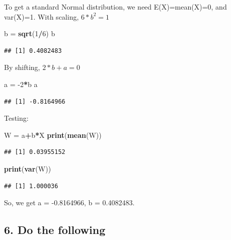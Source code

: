 \documentclass[
]{article}
\newenvironment{Shaded}{\begin{snugshade}}{\end{snugshade}}
\newcommand{\DecValTok}[1]{\textcolor[rgb]{0.00,0.00,0.81}{#1}}
\newcommand{\KeywordTok}[1]{\textcolor[rgb]{0.13,0.29,0.53}{\textbf{#1}}}
\newcommand{\NormalTok}[1]{#1}
\newcommand{\OperatorTok}[1]{\textcolor[rgb]{0.81,0.36,0.00}{\textbf{#1}}}
\newcommand{\StringTok}[1]{\textcolor[rgb]{0.31,0.60,0.02}{#1}}
\begin{document}
To get a standard Normal distribution, we need E(X)=mean(X)=0, and
var(X)=1. With scaling, \(6*b^2=1\)

\begin{Shaded}
\begin{Highlighting}[]
\NormalTok{b =}\StringTok{ }\KeywordTok{sqrt}\NormalTok{(}\DecValTok{1}\OperatorTok{/}\DecValTok{6}\NormalTok{)}
\NormalTok{b}
\end{Highlighting}
\end{Shaded}

\begin{verbatim}
## [1] 0.4082483
\end{verbatim}

By shifting, \(2*b+a=0\)

\begin{Shaded}
\begin{Highlighting}[]
\NormalTok{a =}\StringTok{ }\DecValTok{-2}\OperatorTok{*}\NormalTok{b}
\NormalTok{a}
\end{Highlighting}
\end{Shaded}

\begin{verbatim}
## [1] -0.8164966
\end{verbatim}

Testing:

\begin{Shaded}
\begin{Highlighting}[]
\NormalTok{W =}\StringTok{ }\NormalTok{a}\OperatorTok{+}\NormalTok{b}\OperatorTok{*}\NormalTok{X}
\KeywordTok{print}\NormalTok{(}\KeywordTok{mean}\NormalTok{(W))}
\end{Highlighting}
\end{Shaded}

\begin{verbatim}
## [1] 0.03955152
\end{verbatim}

\begin{Shaded}
\begin{Highlighting}[]
\KeywordTok{print}\NormalTok{(}\KeywordTok{var}\NormalTok{(W))}
\end{Highlighting}
\end{Shaded}

\begin{verbatim}
## [1] 1.000036
\end{verbatim}

So, we get a = -0.8164966, b = 0.4082483.

\hypertarget{do-the-following}{%
\subsection{6. Do the following}\label{do-the-following}}
\end{document}
